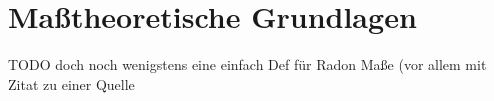 %




\section{Maßtheoretische Grundlagen}
 
TODO doch noch wenigstens eine einfach Def für Radon Maße (vor allem mit Zitat 
zu einer Quelle

% 
% 
% 
% 

